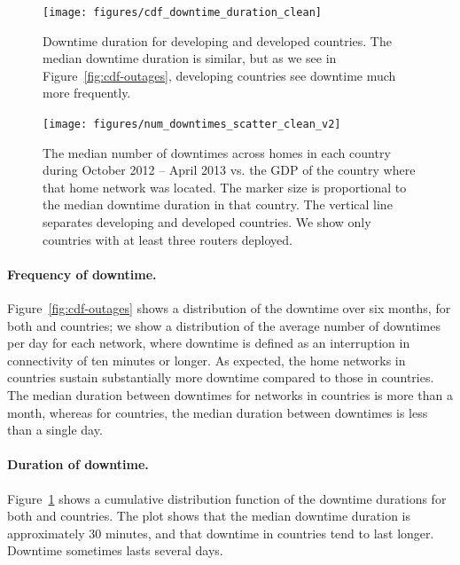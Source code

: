 \begin{figure}[t]
  \begin{minipage}{\linewidth}
  \texttt{[image: figures/cdf\_downtime\_duration\_clean]}
  \caption{Downtime duration for developing and developed
    countries. The median downtime duration 
   is similar, but as we see in Figure~\ref{fig:cdf-outages}, 
   developing countries see downtime much more frequently.}
  \label{fig:cdf-outage-duration}
  \end{minipage}
\end{figure}


\begin{figure}[t]
  \begin{minipage}{\linewidth}
  \texttt{[image: figures/num\_downtimes\_scatter\_clean\_v2]}
  \caption{The median number of downtimes across homes in each
    country during October 2012 -- April 2013 vs. the GDP of the country where that home
    network was located. The marker size is proportional to the median downtime duration
    in that country. The vertical line separates
    developing and developed countries. We show only countries with
    at least three routers deployed.}
  \label{fig:outages-scatter}
  \end{minipage}
\end{figure}



\paragraph{Frequency of downtime.}  Figure~\ref{fig:cdf-outages} shows a
distribution of the downtime over six months, for both \developed{} and
\developing{} countries; we show a distribution of the average number of
downtimes per day for each network, where downtime is defined as an interruption
in connectivity of ten minutes or longer.  As expected, the home networks in
\developing{} countries sustain substantially more downtime compared to those in
\developed{} countries. The median duration between downtimes for networks in
\developed{} countries is more than a month, whereas for \developing{}
countries, the median duration between downtimes is less than a single day.

\paragraph{Duration of downtime.}
Figure~\ref{fig:cdf-outage-duration} shows a cumulative distribution function
of the downtime durations for both \developing{} and
\developed{} countries.  The plot shows that the median downtime duration 
is approximately 30 minutes, and that downtime in \developing{}
countries tend to last longer.  Downtime sometimes lasts several days.  

